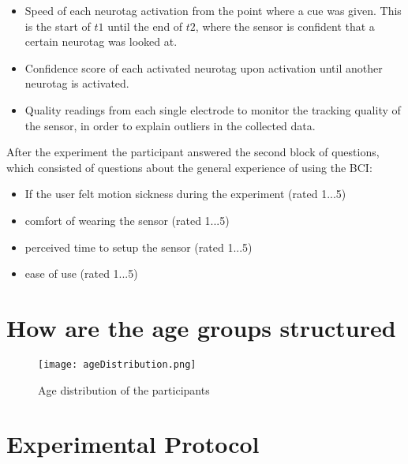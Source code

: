             \begin{itemize}
                \item Speed of each neurotag activation from the point where a cue was given. This is the start of $t1$ until the end of $t2$, where the sensor is confident that a certain neurotag was looked at.
                \item Confidence score of each activated neurotag upon activation until another neurotag is activated.
                \item Quality readings from each single electrode to monitor the tracking quality of the sensor, in order to explain outliers in the collected data.
            \end{itemize}
            
            After the experiment the participant answered the second block of questions, which consisted of questions about the general experience of using the BCI:
            
            \begin{itemize}
                \item If the user felt motion sickness during the experiment (rated 1...5)
                \item comfort of wearing the sensor (rated 1...5)
                \item perceived time to setup the sensor (rated 1...5)
                \item ease of use (rated 1...5) %
            \end{itemize}           

        \section{How are the age groups structured}


            \begin{figure}[h]     %
                \centering
                \texttt{[image: ageDistribution.png]} 
                \caption{Age distribution of the participants}\label{age-dist}
            \end{figure}  

        \section{Experimental Protocol}


